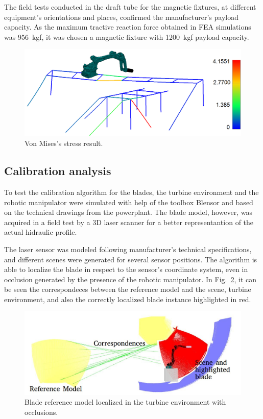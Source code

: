 The field tests conducted in the draft tube for the magnetic fixtures, at
different equipment's orientations and places, confirmed the manufacturer's
payload capacity. As the maximum tractive reaction force obtained in FEA
simulations was 956~kgf, it was chosen a magnetic fixture with 1200~kgf
payload capacity.

\begin{figure}
	\centering
	\includegraphics[width=.95\columnwidth]{figs/mecanica/von_mises.png}
    \caption{Von Mises's stress result.}
    \label{fig:von_mises}
\end{figure}

\subsection{Calibration analysis}

To test the calibration algorithm for the blades, the turbine
environment and the robotic manipulator were simulated with help of the toolbox
Blensor \cite{Gschwandtner11b} and based on the technical drawings from the
powerplant. The blade model, however, was acquired in a field test by a 3D laser
scanner for a better representantion of the actual hidraulic profile.

The laser sensor was modeled following manufacturer's technical
specifications, and different scenes were generated for several sensor
positions. The algorithm is able to localize the blade in respect to the
sensor's coordinate system, even in occlusion generated by the presence of the
robotic manipulator. In Fig.~\ref{fig:calibration}, it can be seen the
correspondeces between the reference model and the scene, turbine
environment, and also the correctly localized blade instance highlighted in red.

\begin{figure}
	\centering
	\includegraphics[width=.95\columnwidth]{figs/results/sim_mh12_sp}
    \caption{Blade reference model localized in the turbine environment with
    occlusions.}
    \label{fig:calibration}
\end{figure}

